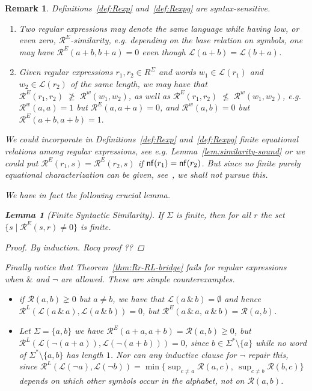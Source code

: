\documentclass{article}
\def\eg{{\em e.g. }}
\newtheorem{lemma}{Lemma}[section]
\newtheorem{remark}{Remark}[section]
\begin{document}
\begin{remark}\label{rem:syntax-semantics-exceptions} 
Definitions~\ref{def:Rexp} and~\ref{def:Rexpg} are syntax-sensitive.%
\begin{enumerate}
\item Two regular expressions may denote the same language while having low, or even zero, $\mathcal{R}^E$-similarity, \eg depending on the base relation on symbols, one may have
$
\mathcal{R}^E(a+b,b+a)=0
$
even though $\mathcal L(a+b)=\mathcal L(b+a)$.
\item Given regular expressions $r_1,r_2\in R^\Sigma$ and words $w_1\in \mathcal L(r_1)$ and $w_2\in \mathcal L(r_2)$ of the same length, we may have that $\mathcal{R}^{E}(r_1,r_2)\; \ngeq \; \mathcal R^w(w_1,w_2)$, as well as $\mathcal{R}^{E}(r_1,r_2)\; \nleq \; \mathcal R^w(w_1,w_2)$, \eg $\mathcal R^w(a,a)=1$ but $\mathcal{R}^{E}(a,a+a)=0$, and $\mathcal R^w(a,b)=0$ but $\mathcal{R}^{E}(a+b,a+b)=1.$
\end{enumerate}
We could incorporate in Definitions~\ref{def:Rexp} and~\ref{def:Rexpg} finite equational relations among regular expressions, see \eg Lemma~\ref{lem:similarity-sound} or we could put $\mathcal R^E(r_1,s) = \mathcal R^E(r_2,s)$ if ${\sf nf}(r_1)={\sf nf}(r_2)$. But since no finite purely equational characterization can be given, see~\cite{Redko,Salomaa,Kozen}, we shall not pursue this.

We have in fact the following crucial lemma.
\begin{lemma}[Finite Syntactic Similarity]\label{lemma:syntactic-similarity}
If $\Sigma$ is finite, then for all $r$ the set $\{ s\mid \mathcal R^E(s,r)\neq 0\}$ is finite.
\end{lemma}
\begin{proof}
By induction. {\color{red} Rocq proof ??}\vspace{0.5cm}

\end{proof}

Finally notice that Theorem~\ref{thm:Rr-RL-bridge} fails for regular expressions when $\&$ and $\neg$ are
allowed. These are simple counterexamples.
\begin{itemize}\sloppy
\item[($\&$)] if $\mathcal R(a,b)\gneq 0$ but $a\neq b$, we have that
$\mathcal L(a\,\&\,b)=\emptyset$ and hence
$\mathcal R^L(\mathcal L(a\,\&\,a),\mathcal L(a\,\&\,b))=0$, but
$\mathcal R^E(a\,\&\,a,\,a\,\&\,b)=\mathcal R(a,b)$. 

\item[($\neg$)] Let $\Sigma=\{a,b\}$ we have
$\mathcal R^E(a+a,a+b)=\mathcal R(a,b)\gneq 0$, but
$\mathcal R^L(\mathcal L(\neg(a+a)),\mathcal L(\neg(a+b)))=0$, since $b\in\Sigma^*\setminus\{a\}$
while no word of $\Sigma^*\setminus\{a,b\}$ has length $1$. Nor can any inductive clause
for $\neg$ repair this, since
$\mathcal R^L(\mathcal L(\neg a),\mathcal L(\neg b))=
\min\{\sup_{c\neq a}\mathcal R(a,c),\ \sup_{c\neq b}\mathcal R(b,c)\}$
depends on which other symbols occur in the alphabet, not on $\mathcal R(a,b)$.
\end{itemize}
\end{remark}
\end{document}

